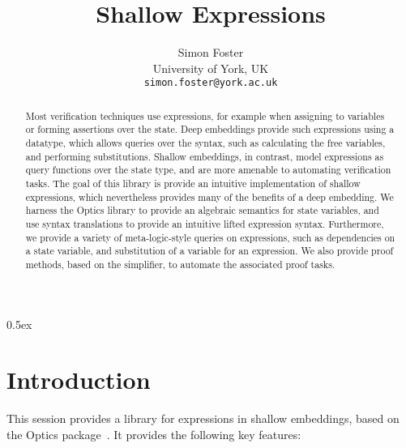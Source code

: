 \documentclass[11pt,a4paper]{article}
\begin{document}
\title{Shallow Expressions}
\author{Simon Foster \\[.5ex] University of York, UK \\[2ex] \texttt{\small simon.foster@york.ac.uk}}
\maketitle

\begin{abstract}
\noindent Most verification techniques use expressions, for example when assigning to variables or 
forming assertions over the state. Deep embeddings provide such expressions using a datatype, which 
allows queries over the syntax, such as calculating the free variables, and performing substitutions. 
Shallow embeddings, in contrast, model expressions as query functions over the state type, and are 
more amenable to automating verification tasks. The goal of this library is provide an intuitive 
implementation of shallow expressions, which nevertheless provides many of the benefits of a deep 
embedding. We harness the Optics library to provide an algebraic semantics for state variables,
and use syntax translations to provide an intuitive lifted expression syntax. Furthermore, we
provide a variety of meta-logic-style queries on expressions, such as dependencies
on a state variable, and substitution of a variable for an expression. We also provide proof 
methods, based on the simplifier, to automate the associated proof tasks.
\end{abstract}

\tableofcontents

\parindent 0pt\parskip 0.5ex

\section{Introduction}

This session provides a library for expressions in shallow embeddings, based on the Optics
package~\cite{Optics-AFP}. It provides the following key features:
\end{document}

